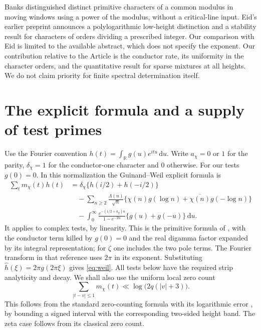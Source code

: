 \documentclass[11pt]{article}
\newcommand{\R}{\mathbb R}\newcommand{\C}{\mathbb C}
\newcommand{\dd}{\,\mathrm d}
\begin{document}
Banks \cite{banks} distinguished distinct primitive characters of a common modulus in moving windows using a power of the modulus, without a critical-line input. Eid's earlier preprint \cite{eid} announces a polylogarithmic low-height distinction and a stability result for characters of orders dividing a prescribed integer. Our comparison with Eid is limited to the available abstract, which does not specify the exponent. Our contribution relative to the Article is the conductor rate, its uniformity in the character orders, and the quantitative result for sparse mixtures at all heights. We do not claim priority for finite spectral determination itself.

\section{The explicit formula and a supply of test primes}
Use the Fourier convention $h(t)=\int_\R g(u)e^{itu}\dd u$. Write $a_\chi=0$ or $1$ for the parity, $\delta_\chi=1$ for the conductor-one character and $0$ otherwise. For our tests $g(0)=0$. In this normalization the Guinand--Weil explicit formula is
\begin{align}
 \sum_t m_\chi(t)h(t)
 &=\delta_\chi\{h(i/2)+h(-i/2)\} \nonumber\\
 &\quad-\sum_{n\ge2}\frac{\Lambda(n)}{\sqrt n}
 \{\chi(n)g(\log n)+\overline{\chi(n)}g(-\log n)\}\nonumber\\
 &\quad-\int_0^\infty
 \frac{e^{-(1/2+a_\chi)u}}{1-e^{-2u}}\{g(u)+g(-u)\}\dd u .
 \label{eq:weil}
\end{align}
It applies to complex tests, by linearity. This is the primitive formula of \cite[eq.~(2.1)]{weil}, with the conductor term killed by $g(0)=0$ and the real digamma factor expanded by its integral representation; for $\zeta$ one includes the two pole terms. The Fourier transform in that reference uses $2\pi$ in its exponent. Substituting $\widehat h(\xi)=2\pi g(2\pi\xi)$ gives \eqref{eq:weil}. All tests below have the required strip analyticity and decay. We shall also use the uniform local zero count
\begin{equation}\label{eq:count}
 \sum_{|t-v|\le1}m_\chi(t)\ll\log\big(2q(|v|+3)\big).
\end{equation}
This follows from the standard zero-counting formula with its logarithmic error \cite{count}, by bounding a signed interval with the corresponding two-sided height band. The zeta case follows from its classical zero count.
\end{document}
